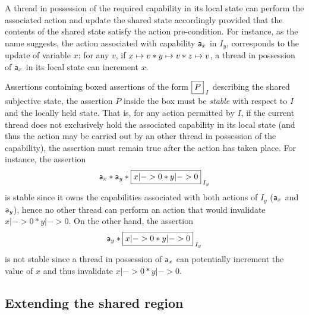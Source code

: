 A thread in possession of the required capability in its local state
can perform the associated action and update the shared state
accordingly provided that the contents of the shared state satisfy the
action pre-condition.  For instance, as the name suggests, the action
associated with capability $\mathsf{a}_x$ in $I_y$, corresponds to the
update of variable $x$: for any $v$, if $x \mapsto v * y \mapsto v *
z \mapsto v$, a thread in possession of $\mathsf{a}_x$ in its local
state can increment $x$.

Assertions containing boxed assertions of the form $\shared{P}{I}$
describing the shared subjective state, the assertion $P$ inside the
box must be \emph{stable} with respect to $I$ and the locally held
state. That is, for any action permitted by $I$, if the current thread
does not exclusively hold the associated capability in its local state
(and thus the action may be carried out by an other thread in
possession of the capability), the assertion must remain true after
the action has taken place. For instance, the assertion
\[
\token a_x * \token a_y * \shared{x|->0 * y|->0}{I_y}
\]
is stable since it owns the capabilities associated with both actions
of $I_y$ ($\mathsf{a}_x$ and $\mathsf{a}_y$), hence no other thread can
perform an action that would invalidate $x|->0 * y|->0$. On the other
hand, the assertion
\[
\token a_y * \shared{x|->0 * y|->0}{I_y}
\]
is not stable since a thread in possession of $\mathsf{a}_x$ can
potentially increment the value of $x$ and thus invalidate $x|->0 *
y|->0$.

\subsection{Extending the shared region}
\label{subsec:extend}

